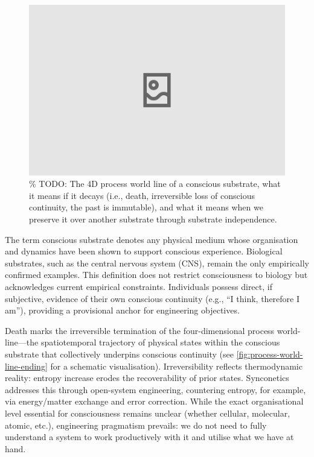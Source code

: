 \documentclass[10pt]{article}
\begin{document}
\begin{sloppypar}
  \begin{figure}[ht!]
    \centering
    \includegraphics[width=\textwidth]{figures/4D-process-world-line-ending.png}
    \caption{\% TODO: The 4D process world line of a conscious substrate, what it means if it decays (i.e., death, irreversible loss of conscious continuity, the past is immutable), and what it means when we preserve it over another substrate through substrate independence.}
    \label{fig:process-world-line-ending}
  \end{figure}

  The term conscious substrate denotes any physical medium whose organisation and dynamics have been shown to support conscious experience. Biological substrates, such as the central nervous system (CNS), remain the only empirically confirmed examples. This definition does not restrict consciousness to biology but acknowledges current empirical constraints. Individuals possess direct, if subjective, evidence of their own conscious continuity (e.g., “I think, therefore I am”), providing a provisional anchor for engineering objectives.

  Death marks the irreversible termination of the four-dimensional process world-line—the spatiotemporal trajectory of physical states within the conscious substrate that collectively underpins conscious continuity (see \autoref{fig:process-world-line-ending} for a schematic visualisation). Irreversibility reflects thermodynamic reality: entropy increase erodes the recoverability of prior states. Synconetics addresses this through open-system engineering, countering entropy, for example, via energy/matter exchange and error correction. While the exact organisational level essential for consciousness remains unclear (whether cellular, molecular, atomic, etc.), engineering pragmatism prevails: we do not need to fully understand a system to work productively with it and utilise what we have at hand.


\end{sloppypar}
\end{document}
